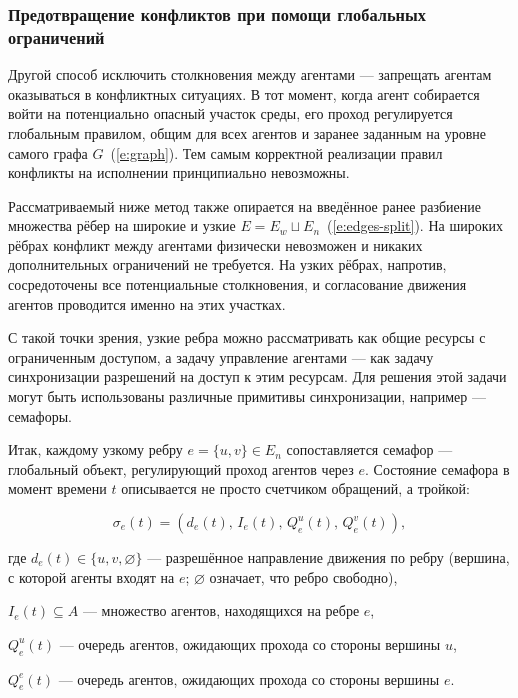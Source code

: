 \subsubsection{Предотвращение конфликтов при помощи глобальных ограничений}

Другой способ исключить столкновения между агентами --- запрещать агентам оказываться в конфликтных ситуациях. 
В тот момент, когда агент собирается войти на потенциально опасный участок среды, его проход
регулируется глобальным правилом, общим для всех агентов и заранее заданным на уровне самого
графа $G$~(\ref{e:graph}). Тем самым корректной реализации правил конфликты на исполнении принципиально невозможны.

Рассматриваемый ниже метод также опирается на введённое ранее разбиение множества рёбер
 на широкие и узкие $E = E_{w} \sqcup E_{n}$~(\ref{e:edges-split}). На широких рёбрах конфликт между
агентами физически невозможен и никаких дополнительных ограничений не требуется. На узких рёбрах,
напротив, сосредоточены все потенциальные столкновения, и согласование движения агентов проводится
именно на этих участках.

С такой точки зрения, узкие ребра можно рассматривать как общие ресурсы с ограниченным доступом,
а задачу управление агентами --- как задачу синхронизации разрешений на доступ к этим ресурсам. 
Для решения этой задачи могут быть использованы различные примитивы синхронизации, например --- семафоры.

Итак, каждому узкому ребру $e = \{u, v\} \in E_{n}$ сопоставляется семафор --- глобальный объект,
регулирующий проход агентов через $e$. Состояние семафора в момент времени $t$ описывается не просто 
счетчиком обращений, а тройкой:

\begin{equation}
    \sigma_e(t) = \left( d_e(t),\, I_e(t),\, Q_e^{u}(t),\, Q_e^{v}(t) \right),
\end{equation}

где $d_e(t) \in \{u, v, \varnothing\}$ --- разрешённое направление движения по ребру 
(вершина, с которой агенты входят на $e$; $\varnothing$ означает, что ребро свободно),\par 
$I_e(t) \subseteq A$ --- множество агентов, находящихся на ребре $e$, \par
$Q_e^{u}(t)$ --- очередь агентов, ожидающих прохода со стороны вершины $u$, \par
$Q_e^{e}(t)$ --- очередь агентов, ожидающих прохода со стороны вершины $e$.

